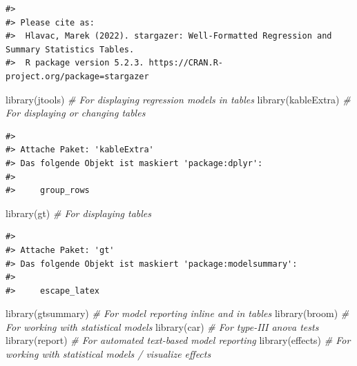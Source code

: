\documentclass[
  11pt,
  a4paper,
  twoside]{scrbook}
\newenvironment{Shaded}{\begin{snugshade}}{\end{snugshade}}
\newcommand{\CommentTok}[1]{\textcolor[rgb]{0.56,0.35,0.01}{\textit{#1}}}
\newcommand{\FunctionTok}[1]{\textcolor[rgb]{0.00,0.00,0.00}{#1}}
\newcommand{\NormalTok}[1]{#1}
\begin{document}
\linespread{1}

\begin{verbatim}
#> 
#> Please cite as:
#>  Hlavac, Marek (2022). stargazer: Well-Formatted Regression and Summary Statistics Tables.
#>  R package version 5.2.3. https://CRAN.R-project.org/package=stargazer
\end{verbatim}

\linespread{1}

\begin{Shaded}
\begin{Highlighting}[]
\FunctionTok{library}\NormalTok{(jtools) }\CommentTok{\# For displaying regression models in tables}
\FunctionTok{library}\NormalTok{(kableExtra) }\CommentTok{\# For displaying or changing tables}
\end{Highlighting}
\end{Shaded}

\linespread{1}

\begin{verbatim}
#> 
#> Attache Paket: 'kableExtra'
#> Das folgende Objekt ist maskiert 'package:dplyr':
#> 
#>     group_rows
\end{verbatim}

\linespread{1}

\begin{Shaded}
\begin{Highlighting}[]
\FunctionTok{library}\NormalTok{(gt) }\CommentTok{\# For displaying tables}
\end{Highlighting}
\end{Shaded}

\linespread{1}

\begin{verbatim}
#> 
#> Attache Paket: 'gt'
#> Das folgende Objekt ist maskiert 'package:modelsummary':
#> 
#>     escape_latex
\end{verbatim}

\linespread{1}

\begin{Shaded}
\begin{Highlighting}[]
\FunctionTok{library}\NormalTok{(gtsummary) }\CommentTok{\# For model reporting inline and in tables}
\FunctionTok{library}\NormalTok{(broom) }\CommentTok{\# For working with statistical models}
\FunctionTok{library}\NormalTok{(car) }\CommentTok{\# For type{-}III anova tests}
\FunctionTok{library}\NormalTok{(report) }\CommentTok{\# For automated text{-}based model reporting}
\FunctionTok{library}\NormalTok{(effects) }\CommentTok{\# For working with statistical models / visualize effects}
\end{Highlighting}
\end{Shaded}
\end{document}
